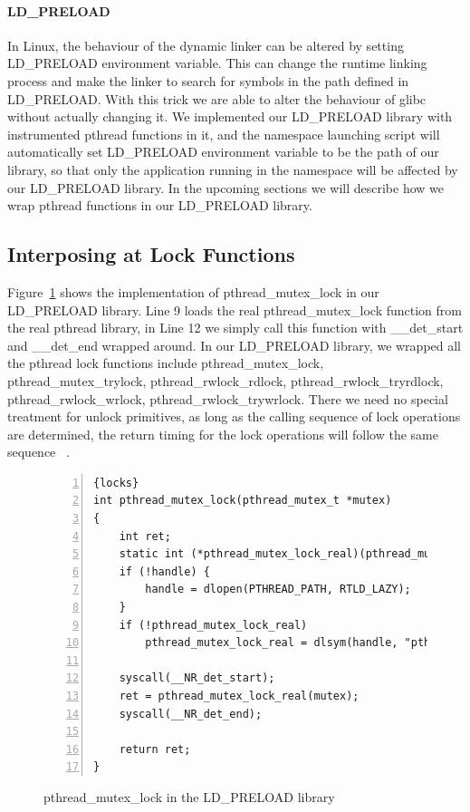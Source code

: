 \paragraph{LD\_PRELOAD}
In Linux, the behaviour of the dynamic linker can be altered by setting LD\_PRELOAD environment variable. This can change the runtime linking process and make the linker to search for symbols in the path defined in LD\_PRELOAD. With this trick we are able to alter the behaviour of glibc without actually changing it. We implemented our LD\_PRELOAD library with instrumented pthread functions in it, and the namespace launching script will automatically set LD\_PRELOAD environment variable to be the path of our library, so that only the application running in the namespace will be affected by our LD\_PRELOAD library. In the upcoming sections we will describe how we wrap pthread functions in our LD\_PRELOAD library.

\subsection{Interposing at Lock Functions}

Figure~\ref{f:orverridelocks} shows the implementation of pthread\_mutex\_lock in our LD\_PRELOAD library. Line 9 loads the real pthread\_mutex\_lock function from the real pthread library, in Line 12 we simply call this function with \_\_det\_start and \_\_det\_end wrapped around. In our LD\_PRELOAD library, we wrapped all the pthread lock functions include pthread\_mutex\_lock, pthread\_mutex\_trylock, pthread\_rwlock\_rdlock, pthread\_rwlock\_tryrdlock, pthread\_rwlock\_wrlock, pthread\_rwlock\_trywrlock. There we need no special treatment for unlock primitives, as long as the calling sequence of lock operations are determined, the return timing for the lock operations will follow the same sequence ~\cite{merrifieldincreasing}.

\begin{figure}
\begin{lstlisting}[numbers=left, frame=single, basicstyle=\small, breaklines]{locks}
int pthread_mutex_lock(pthread_mutex_t *mutex)
{
    int ret;
    static int (*pthread_mutex_lock_real)(pthread_mutex_t *mutex) = NULL;    
    if (!handle) {
        handle = dlopen(PTHREAD_PATH, RTLD_LAZY);
    }
    if (!pthread_mutex_lock_real)
        pthread_mutex_lock_real = dlsym(handle, "pthread_mutex_lock");

    syscall(__NR_det_start);
    ret = pthread_mutex_lock_real(mutex);
    syscall(__NR_det_end);

    return ret;
}
\end{lstlisting}
\caption{pthread\_mutex\_lock in the LD\_PRELOAD library}
\label{f:orverridelocks}
\end{figure}

